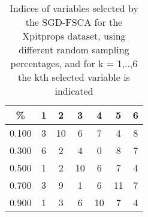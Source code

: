 \begin{table}
	\begin{center}
		\begin{tabular}{c c c c c c c}
			\% & 1 & 2 & 3 & 4 & 5 & 6 \\
			\hline
			0.100 & 3 & 10 & 6 & 7 & 4 & 8 \\
			0.300 & 6 & 2 & 4 & 0 & 8 & 7 \\
			0.500 & 1 & 2 & 10 & 6 & 7 & 4 \\
			0.700 & 3 & 9 & 1 & 6 & 11 & 7 \\
			0.900 & 1 & 3 & 6 & 10 & 7 & 4 \\
		\end{tabular}
	\end{center}
	\caption{Indices of variables selected by the SGD-FSCA for the Xpitprops dataset, using different random sampling percentages, and for k = 1,..,6 the kth selected variable is indicated}
\end{table}